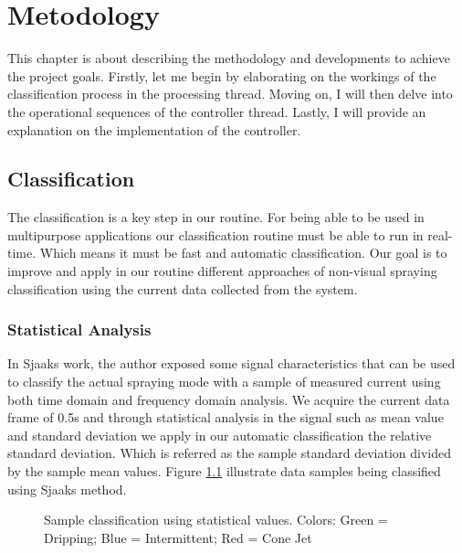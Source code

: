 \chapter{Metodology}
\label{chap:Metodology}

This chapter is about describing the methodology and developments to achieve the project goals. 
Firstly, let me begin by elaborating on the workings of the classification process in the processing thread. Moving on, I will then delve into the operational sequences of the controller thread. Lastly, I will provide an explanation on the implementation of the controller.


\section{Classification}
\label{sec:section_classification}

The classification is a key step in our routine. For being able to be used in multipurpose applications our classification routine must be able to run in real-time. Which means it must be fast and automatic classification.
Our goal is to improve and apply in our routine different approaches of non-visual spraying classification using the current data collected from the system.

\subsection{Statistical Analysis}
In Sjaaks\cite{Sjaaks} work, the author exposed some signal characteristics that can be used to classify the actual spraying mode with a sample of measured current using both time domain and frequency domain analysis.
We acquire the current data frame of 0.5s and through statistical analysis in the signal such as mean value and standard deviation we apply in our automatic classification the relative standard deviation. Which is referred as the sample standard deviation divided by the sample mean values. Figure \ref{fig:sjaaks_statistical_class} illustrate data samples being classified using Sjaaks method.

\begin{figure}[H]
    \centering
    \caption{Sample classification using statistical values. Colors: Green = Dripping; Blue = Intermittent; Red = Cone Jet}
    \label{fig:sjaaks_statistical_class}
\end{figure}

